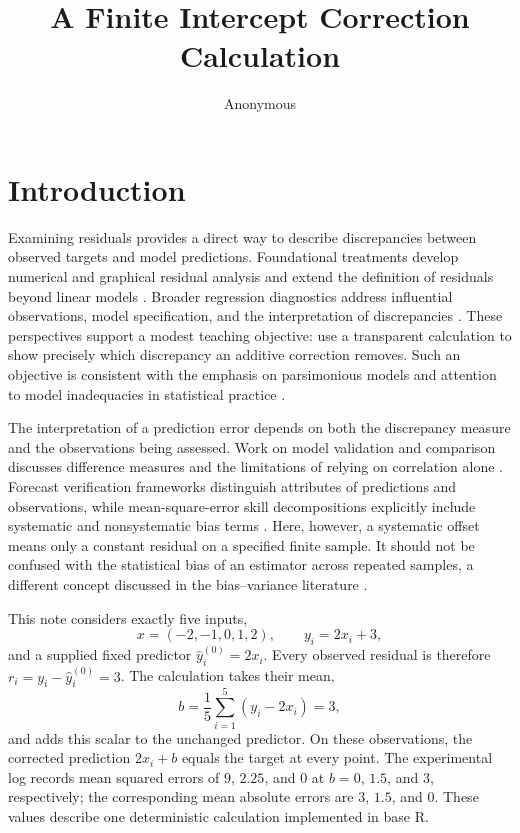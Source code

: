 \documentclass[11pt]{article}
\title{A Finite Intercept Correction Calculation}
\author{Anonymous}
\date{}
\begin{document}
\maketitle
\begin{abstract}
\end{abstract}
\section{Introduction}

Examining residuals provides a direct way to describe discrepancies between observed targets and model predictions. Foundational treatments develop numerical and graphical residual analysis and extend the definition of residuals beyond linear models \cite{Anscombe1963ExaminationAnalysis,Cox1968GeneralDefinition}. Broader regression diagnostics address influential observations, model specification, and the interpretation of discrepancies \cite{Belsley1980RegressionDiagnostics,Bollen1985RegressionDiagnostics,Davison1992RegressionModel}. These perspectives support a modest teaching objective: use a transparent calculation to show precisely which discrepancy an additive correction removes. Such an objective is consistent with the emphasis on parsimonious models and attention to model inadequacies in statistical practice \cite{Box1976ScienceStatistics}.

The interpretation of a prediction error depends on both the discrepancy measure and the observations being assessed. Work on model validation and comparison discusses difference measures and the limitations of relying on correlation alone \cite{Willmott1981ValidationModels,Willmott1985StatisticsEvaluation}. Forecast verification frameworks distinguish attributes of predictions and observations, while mean-square-error skill decompositions explicitly include systematic and nonsystematic bias terms \cite{Murphy1987GeneralFramework,Murphy1988SkillScores}. Here, however, a systematic offset means only a constant residual on a specified finite sample. It should not be confused with the statistical bias of an estimator across repeated samples, a different concept discussed in the bias--variance literature \cite{Geman1992NeuralNetworks}.

This note considers exactly five inputs,
\[
x=(-2,-1,0,1,2),
\qquad y_i=2x_i+3,
\]
and a supplied fixed predictor $\hat y_i^{(0)}=2x_i$. Every observed residual is therefore $r_i=y_i-\hat y_i^{(0)}=3$. The calculation takes their mean,
\[
b=\frac{1}{5}\sum_{i=1}^{5}(y_i-2x_i)=3,
\]
and adds this scalar to the unchanged predictor. On these observations, the corrected prediction $2x_i+b$ equals the target at every point. The experimental log records mean squared errors of $9$, $2.25$, and $0$ at $b=0$, $1.5$, and $3$, respectively; the corresponding mean absolute errors are $3$, $1.5$, and $0$. These values describe one deterministic calculation implemented in base R.
\end{document}
